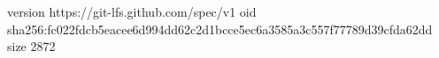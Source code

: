 version https://git-lfs.github.com/spec/v1
oid sha256:fc022fdcb5eacee6d994dd62c2d1bcce5ec6a3585a3c557f77789d39cfda62dd
size 2872
